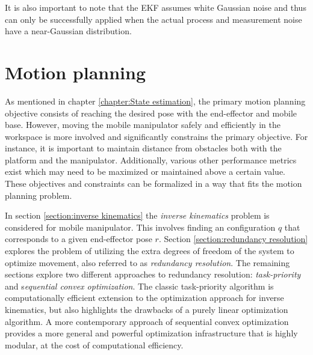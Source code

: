\documentclass[times, utf8, diplomski, english]{fer}
\begin{document}
It is also important to note that the EKF assumes white Gaussian noise and thus can only be successfully applied when the actual process and measurement noise have a near-Gaussian distribution.











\chapter{Motion planning}\label{chapter:motion planning}
As mentioned in chapter \ref{chapter:State estimation}, the primary motion planning objective consists of reaching the desired pose with the end-effector and mobile base.
However, moving the mobile manipulator safely and efficiently in the workspace is more involved and significantly constrains the primary objective. 
For instance, it is important to maintain distance from obstacles both with the platform and the manipulator.
Additionally, various other performance metrics exist which may need to be maximized or maintained above a certain value.
These objectives and constraints can be formalized in a way that fits the motion planning problem.

In section \ref{section:inverse kinematics} the \textit{inverse kinematics} problem is considered for mobile manipulator.
This involves finding an configuration $q$ that corresponds to a given end-effector pose $r$.
Section \ref{section:redundancy resolution} explores the problem of utilizing the extra degrees of freedom of the system to optimize movement, also referred to as \textit{redundancy resolution}.
The remaining sections explore two different approaches to redundancy resolution: \textit{task-priority} and s\textit{equential convex optimization}. 
The classic task-priority algorithm is computationally efficient extension to the optimization approach for inverse kinematics, but also highlights the drawbacks of a purely linear optimization algorithm.
A more contemporary approach of sequential convex optimization provides a more general and powerful optimization infrastructure that is highly modular, at the cost of computational efficiency.
\end{document}
